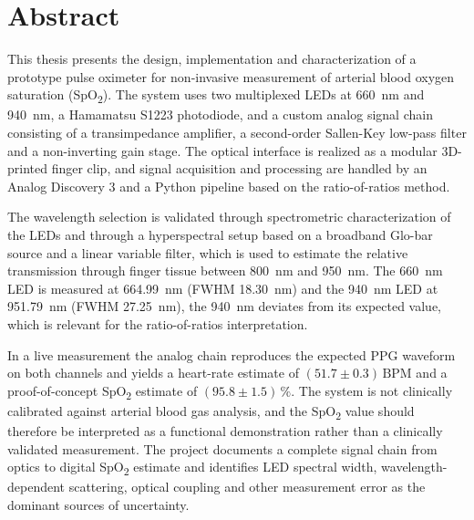 \section*{Abstract}

This thesis presents the design, implementation and characterization of a prototype pulse oximeter for non-invasive measurement of arterial blood oxygen saturation (SpO\textsubscript{2}). The system uses two multiplexed LEDs at \SI{660}{nm} and \SI{940}{nm}, a Hamamatsu S1223 photodiode, and a custom analog signal chain consisting of a transimpedance amplifier, a second-order Sallen-Key low-pass filter and a non-inverting gain stage. The optical interface is realized as a modular 3D-printed finger clip, and signal acquisition and processing are handled by an Analog Discovery 3 and a Python pipeline based on the ratio-of-ratios method.

The wavelength selection is validated through spectrometric characterization of the LEDs and through a hyperspectral setup based on a broadband Glo-bar source and a linear variable filter, which is used to estimate the relative transmission through finger tissue between \SI{800}{nm} and \SI{950}{nm}. The \SI{660}{nm} LED is measured at \SI{664.99}{nm} (FWHM \SI{18.30}{nm}) and the \SI{940}{nm} LED at \SI{951.79}{nm} (FWHM \SI{27.25}{nm}), the \SI{940}{nm} deviates from its expected value, which is relevant for the ratio-of-ratios interpretation.

In a live measurement the analog chain reproduces the expected PPG waveform on both channels and yields a heart-rate estimate of $(51.7 \pm 0.3)\,\mathrm{BPM}$ and a proof-of-concept SpO\textsubscript{2} estimate of $(95.8 \pm 1.5)\,\%$. The system is not clinically calibrated against arterial blood gas analysis, and the SpO\textsubscript{2} value should therefore be interpreted as a functional demonstration rather than a clinically validated measurement. The project documents a complete signal chain from optics to digital SpO\textsubscript{2} estimate and identifies LED spectral width, wavelength-dependent scattering, optical coupling and other measurement error as the dominant sources of uncertainty.
